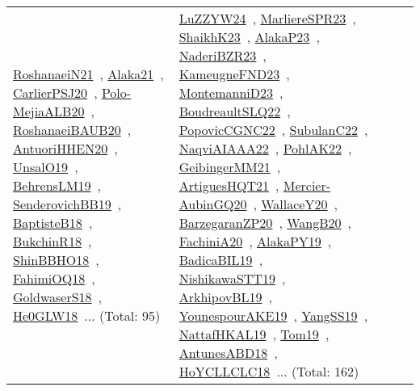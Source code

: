 {\begin{longtable}{lp{3cm}>{\raggedright\arraybackslash}p{6cm}>{\raggedright\arraybackslash}p{6cm}>{\raggedright\arraybackslash}p{8cm}}
\href{../works/RoshanaeiN21.pdf}{RoshanaeiN21}~\cite{RoshanaeiN21}, \href{../works/Alaka21.pdf}{Alaka21}~\cite{Alaka21}, \href{../works/CarlierPSJ20.pdf}{CarlierPSJ20}~\cite{CarlierPSJ20}, \href{../works/Polo-MejiaALB20.pdf}{Polo-MejiaALB20}~\cite{Polo-MejiaALB20}, \href{../works/RoshanaeiBAUB20.pdf}{RoshanaeiBAUB20}~\cite{RoshanaeiBAUB20}, \href{../works/AntuoriHHEN20.pdf}{AntuoriHHEN20}~\cite{AntuoriHHEN20}, \href{../works/UnsalO19.pdf}{UnsalO19}~\cite{UnsalO19}, \href{../works/BehrensLM19.pdf}{BehrensLM19}~\cite{BehrensLM19}, \href{../works/SenderovichBB19.pdf}{SenderovichBB19}~\cite{SenderovichBB19}, \href{../works/BaptisteB18.pdf}{BaptisteB18}~\cite{BaptisteB18}, \href{../works/BukchinR18.pdf}{BukchinR18}~\cite{BukchinR18}, \href{../works/ShinBBHO18.pdf}{ShinBBHO18}~\cite{ShinBBHO18}, \href{../works/FahimiOQ18.pdf}{FahimiOQ18}~\cite{FahimiOQ18}, \href{../works/GoldwaserS18.pdf}{GoldwaserS18}~\cite{GoldwaserS18}, \href{../works/He0GLW18.pdf}{He0GLW18}~\cite{He0GLW18}... (Total: 95) & \href{../works/LuZZYW24.pdf}{LuZZYW24}~\cite{LuZZYW24}, \href{../works/MarliereSPR23.pdf}{MarliereSPR23}~\cite{MarliereSPR23}, \href{../works/ShaikhK23.pdf}{ShaikhK23}~\cite{ShaikhK23}, \href{../works/AlakaP23.pdf}{AlakaP23}~\cite{AlakaP23}, \href{../works/NaderiBZR23.pdf}{NaderiBZR23}~\cite{NaderiBZR23}, \href{../works/KameugneFND23.pdf}{KameugneFND23}~\cite{KameugneFND23}, \href{../works/MontemanniD23.pdf}{MontemanniD23}~\cite{MontemanniD23}, \href{../works/BoudreaultSLQ22.pdf}{BoudreaultSLQ22}~\cite{BoudreaultSLQ22}, \href{../works/PopovicCGNC22.pdf}{PopovicCGNC22}~\cite{PopovicCGNC22}, \href{../works/SubulanC22.pdf}{SubulanC22}~\cite{SubulanC22}, \href{../works/NaqviAIAAA22.pdf}{NaqviAIAAA22}~\cite{NaqviAIAAA22}, \href{../works/PohlAK22.pdf}{PohlAK22}~\cite{PohlAK22}, \href{../works/GeibingerMM21.pdf}{GeibingerMM21}~\cite{GeibingerMM21}, \href{../works/ArtiguesHQT21.pdf}{ArtiguesHQT21}~\cite{ArtiguesHQT21}, \href{../works/Mercier-AubinGQ20.pdf}{Mercier-AubinGQ20}~\cite{Mercier-AubinGQ20}, \href{../works/WallaceY20.pdf}{WallaceY20}~\cite{WallaceY20}, \href{../works/BarzegaranZP20.pdf}{BarzegaranZP20}~\cite{BarzegaranZP20}, \href{../works/WangB20.pdf}{WangB20}~\cite{WangB20}, \href{../works/FachiniA20.pdf}{FachiniA20}~\cite{FachiniA20}, \href{../works/AlakaPY19.pdf}{AlakaPY19}~\cite{AlakaPY19}, \href{../works/BadicaBIL19.pdf}{BadicaBIL19}~\cite{BadicaBIL19}, \href{../works/NishikawaSTT19.pdf}{NishikawaSTT19}~\cite{NishikawaSTT19}, \href{../works/ArkhipovBL19.pdf}{ArkhipovBL19}~\cite{ArkhipovBL19}, \href{../works/YounespourAKE19.pdf}{YounespourAKE19}~\cite{YounespourAKE19}, \href{../works/YangSS19.pdf}{YangSS19}~\cite{YangSS19}, \href{../works/NattafHKAL19.pdf}{NattafHKAL19}~\cite{NattafHKAL19}, \href{../works/Tom19.pdf}{Tom19}~\cite{Tom19}, \href{../works/AntunesABD18.pdf}{AntunesABD18}~\cite{AntunesABD18}, \href{../works/HoYCLLCLC18.pdf}{HoYCLLCLC18}~\cite{HoYCLLCLC18}... (Total: 162)\\

\end{longtable}}
